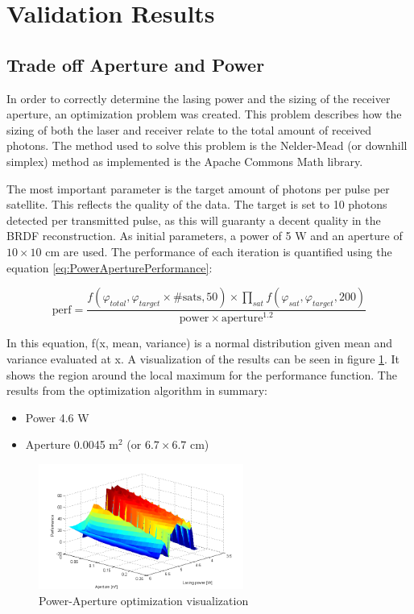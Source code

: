 \section{Validation Results}
\label{sec:ValidationResults}

\subsection{Trade off Aperture and Power}
\label{sec:PowerApertureTradeoff}

In order to correctly determine the lasing power and the sizing of the receiver aperture, an optimization problem was created. This problem describes how the sizing of both the laser and receiver relate to the total amount of received photons. The method used to solve this problem is the Nelder-Mead (or downhill simplex) method as implemented is the Apache Commons Math library.

The most important parameter is the target amount of photons per pulse per satellite. This reflects the quality of the data. The target is set to 10 photons detected per transmitted pulse, as this will guaranty a decent quality in the BRDF reconstruction. As initial parameters, a power of 5 W and an aperture of $10\times10$ cm are used. The performance of each iteration is quantified using the equation \ref{eq:PowerAperturePerformance}:

\begin{equation}
	\text{perf} = \frac {f(\varphi_{total}, \varphi_{target} \times \text{\# sats}, 50) \times 
												\displaystyle\prod_{sat} f(\varphi_{sat}, \varphi_{target}, 200) }
											{ \text{power} \times \text{aperture}^{1.2}}
	\label{eq:PowerAperturePerformance}
\end{equation}

In this equation, f(x, mean, variance) is a normal distribution given mean and variance evaluated at x. A visualization of the results can be seen in figure \ref{fig:PowerAperturePerformance}. It shows the region around the local maximum for the performance function. The results from the optimization algorithm in summary:

\begin{itemize}
	\item Power 4.6 W
	\item Aperture 0.0045 m$^2$ (or $6.7\times6.7$ cm)
\end{itemize}

\begin{figure}[ht]
	\centering
	\includegraphics[width=0.6\textwidth]{chapters/img/optimize-PowerAperture.png}%
		\caption{Power-Aperture optimization visualization}%
		\label{fig:PowerAperturePerformance}%
\end{figure}

